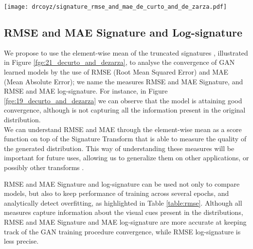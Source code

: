 \documentclass[lettersize,journal]{IEEEtran}
\begin{document}
\begin{figure*}[ht]
\centering
\texttt{[image: drcoyz/signature\_rmse\_and\_mae\_de\_curto\_and\_de\_zarza.pdf]}
\caption{Visual explanation of the use of  to analyze GAN convergence. Samples are resized at  and transformed to grayscale previous to the computation of the signatures. The procedure used for log-signature  is analogous.}
\label{fge:21_decurto_and_dezarza}
\end{figure*}

\subsection{RMSE and MAE Signature and Log-signature}
We propose to use the element-wise mean of the truncated signatures , illustrated in Figure \ref{fge:21_decurto_and_dezarza}, to analyse the convergence of GAN learned models by the use of RMSE (Root Mean Squared Error) and MAE (Mean Absolute Error); we name the measures RMSE and MAE Signature, and RMSE and MAE log-signature. For instance, in Figure \ref{fge:19_decurto_and_dezarza} we can observe that the model is attaining good convergence, although is not capturing all the information present in the original distribution.
\\

We can understand RMSE and MAE through the element-wise mean as a score function on top of the Signature Transform that is able to measure the quality of the generated distribution. This way of understanding these measures will be important for future uses, allowing us to generalize them on other applications, or possibly other transforms \cite{DeCurto22_3}. 

\begin{figure*}[ht]
\centering
{}
\caption{Spectrum of the element-wise mean of the signatures (left) and log-signatures (right) of order 3 and size  of original (`o') against synthetic (`x') samples.}
\label{fge:19_decurto_and_dezarza}
\end{figure*}

RMSE and MAE Signature and log-signature can be used not only to compare models, but also to keep performance of training across several epochs, and analytically detect overfitting, as highlighted in Table \ref{table:rmse}. Although all measures capture information about the visual cues present in the distributions, RMSE and MAE Signature and MAE log-signature are more accurate at keeping track of the GAN training procedure convergence, while RMSE log-signature is less precise.
\end{document}

